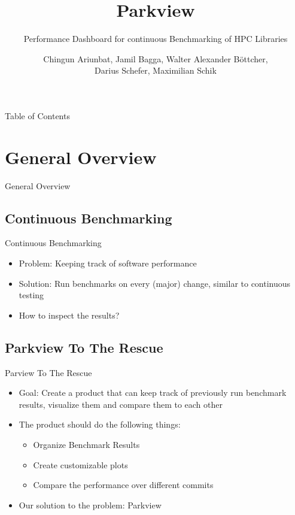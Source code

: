 \documentclass{beamer}
\title{Parkview}
\subtitle{Performance Dashboard for continuous Benchmarking of HPC Libraries}
\author{Chingun Ariunbat, Jamil Bagga, Walter Alexander B\"ottcher,\\Darius Schefer, Maximilian Schik}
\begin{document}
\maketitle

\begin{frame}{Table of Contents}
  \tableofcontents
\end{frame}

\section{General Overview}
\begin{frame}
  \begin{center}
    \Huge{General Overview}
  \end{center}
\end{frame}

\subsection{Continuous Benchmarking}
\begin{frame}{Continuous Benchmarking}
  \begin{itemize}
      \item Problem: Keeping track of software performance
      \item Solution: Run benchmarks on every (major) change, similar to continuous testing
      \item How to inspect the results?
  \end{itemize}
\end{frame}

\subsection{Parkview To The Rescue}
\begin{frame}{Parview To The Rescue}
  \begin{itemize}
      \item Goal: Create a product that can keep track of previously run benchmark results, visualize them and compare them to each other
      \item The product should do the following things:
        \begin{itemize}
          \item Organize Benchmark Results
          \item Create customizable plots
          \item Compare the performance over different commits
        \end{itemize}
      \item Our solution to the problem: Parkview
  \end{itemize}
\end{frame}
\end{document}
